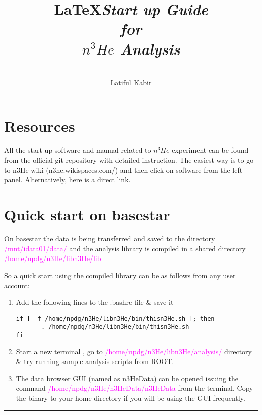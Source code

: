 \documentclass[12pt]{article}
\title{\LaTeX}
\date{}
\title{\emph{\huge\textbf{Start up Guide \\ for \\$n^3He$ Analysis}}
}
\author{\\Latiful Kabir\\
}
\begin{document}
  \maketitle
  
\newpage  
\tableofcontents
\newpage
\setcounter{tocdepth}{2}

\section{Resources}
All the start up software and manual related to $n^3He$ experiment can be found from the official git repository with detailed instruction.
The easiest way is to go to n3He wiki (n3he.wikispaces.com/) and then click on software from the left panel.  
Alternatively, here is a direct link.

\newpage
\section{Quick start on basestar}
On basestar the data is being transferred and saved to the directory \\ \textcolor{magenta}{ /mnt/idata01/data/ }and the analysis library is compiled in a shared directory \textcolor{magenta}{ /home/npdg/n3He/libn3He/lib} 

So a quick start using the compiled library can be as follows from any user account:

\begin{enumerate}
  \item Add the following lines to the .bashrc file \& save it
 
\begin{lstlisting}
if [ -f /home/npdg/n3He/libn3He/bin/thisn3He.sh ]; then
       . /home/npdg/n3He/libn3He/bin/thisn3He.sh
fi
\end{lstlisting}

 \item Start a new terminal , go to  \textcolor{magenta} { /home/npdg/n3He/libn3He/analysis/ }directory \& try running sample analysis scripts from ROOT.
 \item The data browser GUI (named as n3HeData) can be opened issuing the command\textcolor{magenta}{ /home/npdg/n3He/n3HeData/n3HeData } from the terminal. Copy the binary to your home directory if you will be using the GUI frequently.
\end{enumerate}

\noindent
{\color{red} \rule{\linewidth}{1mm} }
\end{document}
